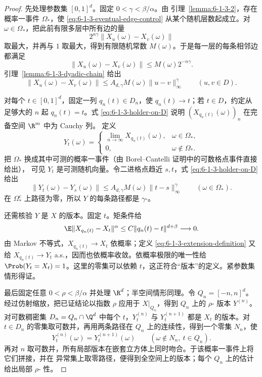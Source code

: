 \begin{proof}
先处理参数集 $[0,1]^d$。固定
$0<\gamma<\beta/\alpha$。由
引理~\ref{lemma:6-1-3-2}，存在概率一事件 $\Omega_*$，使
\eqref{eq:6-1-3-eventual-edge-control} 从某个随机层数起成立。对
$\omega\in\Omega_*$，把此前有限多层中所有边的量
\[
  2^{n\gamma}\|X_u(\omega)-X_v(\omega)\|
\]
取最大，并再与 $1$ 取最大，得到有限随机常数 $M(\omega)$。于是每一层的每条相邻边都满足
\[
 \|X_u(\omega)-X_v(\omega)\|\le M(\omega)2^{-n\gamma}.
\]
引理~\ref{lemma:6-1-3-dyadic-chain} 给出
\[
 \|X_u(\omega)-X_v(\omega)\|
 \le A_{d,\gamma}M(\omega)\|u-v\|_\infty^\gamma
 \qquad(u,v\in D).
 \tag{6.1.15}\label{eq:6-1-3-holder-on-D}
\]

对每个 $t\in[0,1]^d$，固定一列 $q_n(t)\in D_n$，使
$q_n(t)\to t$；若 $t\in D$，约定从足够大的 $n$ 起 $q_n(t)=t$。式
\eqref{eq:6-1-3-holder-on-D} 说明 $(X_{q_n(t)}(\omega))_n$ 在完备空间 $\R^m$ 中为 Cauchy 列。
定义
\[
 Y_t(\omega)=
 \begin{cases}
  \displaystyle\lim_{n\to\infty}X_{q_n(t)}(\omega),&\omega\in\Omega_*,\\
  0,&\omega\notin\Omega_*.
 \end{cases}
 \tag{6.1.16}\label{eq:6-1-3-extension-definition}
\]
把 $\Omega_*$ 换成其中可测的概率一事件（由 Borel--Cantelli 证明中的可数格点事件直接给出），
可见 $Y_t$ 是可测随机向量。令二进格点趋近 $s,t$，式
\eqref{eq:6-1-3-holder-on-D} 给出
\[
 \|Y_t(\omega)-Y_s(\omega)\|
 \le A_{d,\gamma}M(\omega)\|t-s\|_\infty^\gamma
 \qquad(\omega\in\Omega_*).
\]
在 $\Omega_*^c$ 上路径为零，所以 $Y$ 的每条路径都是 $\gamma$-\Holder{}。

还需核验 $Y$ 是 $X$ 的版本。固定 $t$。矩条件给
\[
 \E\|X_{q_n(t)}-X_t\|^\alpha
 \le C\|q_n(t)-t\|^{d+\beta}\longrightarrow0.
\]
由 Markov 不等式，$X_{q_n(t)}\to X_t$ 依概率；定义
\eqref{eq:6-1-3-extension-definition} 又给
$X_{q_n(t)}\to Y_t$ a.s.，因而也依概率收敛。依概率极限的唯一性给
$\Prob(Y_t=X_t)=1$。这里的零集可以依赖 $t$，这正符合“版本”的定义。紧参数集情形得证。

最后固定任意 $0<\rho<\beta/\alpha$ 并处理 $\R^d$；半空间情形同理。令
$Q_n=[-n,n]^d$。经过仿射缩放，把已证结论以指数 $\rho$ 应用于
$X|_{Q_n}$，得到 $Q_n$ 上的 $\rho$-\Holder{} 版本 $Y^{(n)}$。对可数稠密集
$D_n=Q_n\cap\Q^d$ 中每个 $t$，$Y_t^{(n)}$ 与 $Y_t^{(n+1)}$ 都是 $X_t$ 的版本。对
$t\in D_n$ 的零集取可数并，再用两条路径在 $Q_n$ 上的连续性，得到一个零集 $N_n$，使
\[
 Y_t^{(n)}(\omega)=Y_t^{(n+1)}(\omega)
 \qquad(\omega\notin N_n,\ t\in Q_n).
\]
再对 $n$ 取可数并，所有局部版本在嵌套立方体上同时吻合。于该概率一事件上将它们拼接，并在
异常集上取零路径，便得到全空间上的版本；每个 $Q_n$ 上的估计给出局部
$\rho$-\Holder{} 性。
\end{proof}

